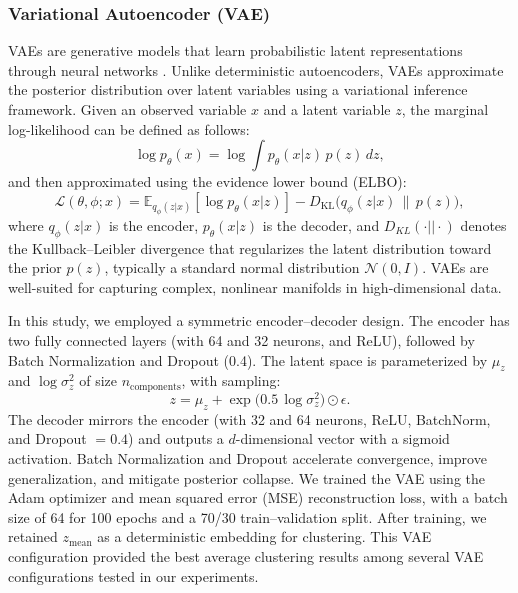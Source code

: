 \documentclass[preprint,12pt]{elsarticle}
\begin{document}
\subsubsection{Variational Autoencoder (VAE)}

VAEs are generative models that learn probabilistic latent representations through neural networks \cite{kingma2013vae}. Unlike deterministic autoencoders, VAEs approximate the posterior distribution over latent variables using a variational inference framework. Given an observed variable \(x\) and a latent variable \(z\), the marginal log-likelihood can be defined as follows:
\begin{equation}
\log p_\theta(x) = \log \int p_\theta(x|z)\, p(z)\, dz,\end{equation}
\noindent and then approximated using the evidence lower bound (ELBO):
\begin{equation}
\mathcal{L}(\theta,\phi; x) = \mathbb{E}_{q_\phi(z|x)} [\log p_\theta(x|z)] 
- D_{\mathrm{KL}}\!\big(q_\phi(z|x)\,\|\,p(z)\big),
\end{equation}
where \(q_\phi(z|x)\) is the encoder, \(p_\theta(x|z)\) is the decoder, and \( D_{KL}(\cdot || \cdot) \) denotes the Kullback–Leibler divergence that regularizes the latent distribution toward the prior \(p(z)\), typically a standard normal distribution \( \mathcal{N}(0, I) \). VAEs are well-suited for capturing complex, nonlinear manifolds in high-dimensional data.

In this study, we employed a symmetric encoder–decoder design. The encoder has two fully connected layers (with 64 and 32 neurons, and ReLU), followed by Batch Normalization and Dropout (0.4). The latent space is parameterized by \(\mu_z\) and \(\log \sigma^2_z\) of size \(n_{\text{components}}\), with sampling:
\begin{equation}
z = \mu_z + \exp\!\big(0.5\, \log \sigma^2_z\big) \odot \epsilon.
\end{equation}
The decoder mirrors the encoder (with 32 and 64 neurons, ReLU, BatchNorm, and Dropout \(=0.4\)) and outputs a \(d\)-dimensional vector with a sigmoid activation. Batch Normalization and Dropout accelerate convergence, improve generalization, and mitigate posterior collapse. We trained the VAE using the Adam optimizer and mean squared error (MSE) reconstruction loss, with a batch size of 64 for 100 epochs and a 70/30 train–validation split. After training, we retained \(z_{\text{mean}}\) as a deterministic embedding for clustering. This VAE configuration provided the best average clustering results among several VAE configurations tested in our experiments.
\end{document}
